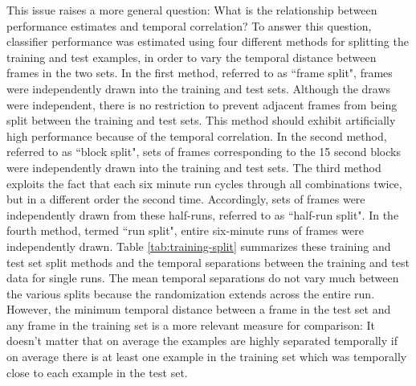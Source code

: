 \documentclass[5p,authoryear]{elsarticle}
\begin{document}
This issue raises a more general question: What is the relationship between performance estimates and temporal correlation?
To answer this question, classifier performance was estimated using four different methods for splitting the training and test examples, in order to vary the temporal distance between frames in the two sets. 
In the first method, referred to as  ``frame split", frames were independently drawn into the training and test sets. 
Although the draws were independent, there is no restriction to prevent adjacent frames from being split between the training and test sets.
This method should exhibit artificially high performance because of the temporal correlation.
In the second method, referred to as ``block split", sets of frames corresponding to the 15 second blocks were independently drawn into the training and test sets.
The third method exploits the fact that each six minute run cycles through all combinations twice, but in a different order the second time.
Accordingly, sets of frames were independently drawn from these half-runs, referred to as ``half-run split". 
In the fourth method, termed ``run split", entire six-minute runs of frames were independently drawn. 
Table \ref{tab:training-split} summarizes these training and test set split methods and the temporal separations between the training and test data for single runs. 
The mean temporal separations do not vary much between the various splits because the randomization extends across the entire run. 
However, the minimum temporal distance between a frame in the test set and any frame in the training set is a more relevant measure for comparison: It doesn't matter that on average the examples are highly separated temporally if on average there is at least one example in the training set which was temporally close to each example in the test set.

\end{document}
